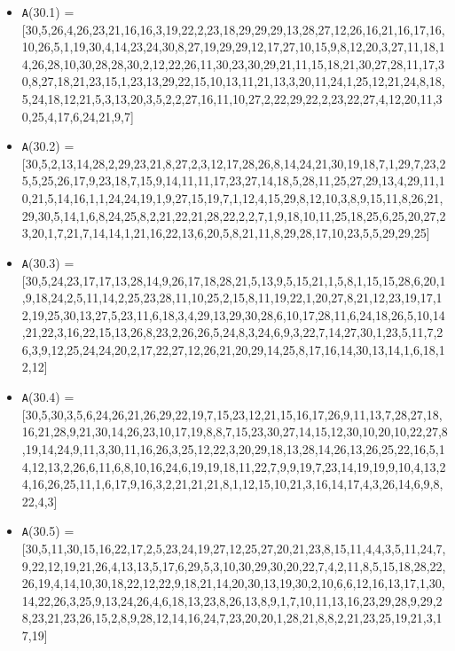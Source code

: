 \documentclass[runningheads,a4paper]{llncs}
\begin{document}
\begin{itemize}
	\item {\texttt A(30.1) = } [30,5,26,4,26,23,21,16,16,3,19,22,2,23,18,29,29,29,13,28,27,12,26,16,21,16,17,16,10,26,5,1,19,30,4,14,23,24,30,8,27,19,29,29,12,17,27,10,15,9,8,12,20,3,27,11,18,14,26,28,10,30,28,28,30,2,12,22,26,11,30,23,30,29,21,11,15,18,21,30,27,28,11,17,30,8,27,18,21,23,15,1,23,13,29,22,15,10,13,11,21,13,3,20,11,24,1,25,12,21,24,8,18,5,24,18,12,21,5,3,13,20,3,5,2,2,27,16,11,10,27,2,22,29,22,2,23,22,27,4,12,20,11,30,25,4,17,6,24,21,9,7]
	
	\item {\texttt A(30.2) = } [30,5,2,13,14,28,2,29,23,21,8,27,2,3,12,17,28,26,8,14,24,21,30,19,18,7,1,29,7,23,25,5,25,26,17,9,23,18,7,15,9,14,11,11,17,23,27,14,18,5,28,11,25,27,29,13,4,29,11,10,21,5,14,16,1,1,24,24,19,1,9,27,15,19,7,1,12,4,15,29,8,12,10,3,8,9,15,11,8,26,21,29,30,5,14,1,6,8,24,25,8,2,21,22,21,28,22,2,2,7,1,9,18,10,11,25,18,25,6,25,20,27,23,20,1,7,21,7,14,14,1,21,16,22,13,6,20,5,8,21,11,8,29,28,17,10,23,5,5,29,29,25]
	\item {\texttt A(30.3) = } [30,5,24,23,17,17,13,28,14,9,26,17,18,28,21,5,13,9,5,15,21,1,5,8,1,15,15,28,6,20,1,9,18,24,2,5,11,14,2,25,23,28,11,10,25,2,15,8,11,19,22,1,20,27,8,21,12,23,19,17,12,19,25,30,13,27,5,23,11,6,18,3,4,29,13,29,30,28,6,10,17,28,11,6,24,18,26,5,10,14,21,22,3,16,22,15,13,26,8,23,2,26,26,5,24,8,3,24,6,9,3,22,7,14,27,30,1,23,5,11,7,26,3,9,12,25,24,24,20,2,17,22,27,12,26,21,20,29,14,25,8,17,16,14,30,13,14,1,6,18,12,12]
	\item {\texttt A(30.4) = } [30,5,30,3,5,6,24,26,21,26,29,22,19,7,15,23,12,21,15,16,17,26,9,11,13,7,28,27,18,16,21,28,9,21,30,14,26,23,10,17,19,8,8,7,15,23,30,27,14,15,12,30,10,20,10,22,27,8,19,14,24,9,11,3,30,11,16,26,3,25,12,22,3,20,29,18,13,28,14,26,13,26,25,22,16,5,14,12,13,2,26,6,11,6,8,10,16,24,6,19,19,18,11,22,7,9,9,19,7,23,14,19,19,9,10,4,13,24,16,26,25,11,1,6,17,9,16,3,2,21,21,21,8,1,12,15,10,21,3,16,14,17,4,3,26,14,6,9,8,22,4,3]
	\item {\texttt A(30.5) = } [30,5,11,30,15,16,22,17,2,5,23,24,19,27,12,25,27,20,21,23,8,15,11,4,4,3,5,11,24,7,9,22,12,19,21,26,4,13,13,5,17,6,29,5,3,10,30,29,30,20,22,7,4,2,11,8,5,15,18,28,22,26,19,4,14,10,30,18,22,12,22,9,18,21,14,20,30,13,19,30,2,10,6,6,12,16,13,17,1,30,14,22,26,3,25,9,13,24,26,4,6,18,13,23,8,26,13,8,9,1,7,10,11,13,16,23,29,28,9,29,28,23,21,23,26,15,2,8,9,28,12,14,16,24,7,23,20,20,1,28,21,8,8,2,21,23,25,19,21,3,17,19]
	

\end{itemize}
\end{document}
